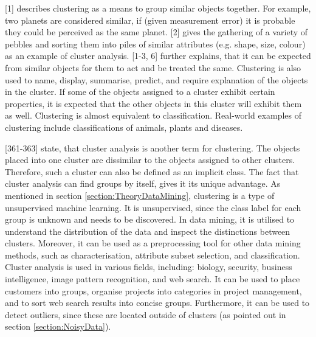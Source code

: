 


\textcite{hartigan1975clustering}[1] describes clustering as a means to group similar objects together. For example, two planets are considered similar, if (given measurement error) it is probable they could be perceived as the same planet. \textcite{romesburg2004cluster}[2] gives the gathering of a variety of pebbles and sorting them into piles of similar attributes (e.g. shape, size, colour) as an example of cluster analysis. \textcite{hartigan1975clustering}[1-3, 6] further explains, that it can be expected from similar objects for them to act and be treated the same. Clustering is also used to name, display, summarise, predict, and require explanation of the objects in the cluster. If some of the objects assigned to a cluster exhibit certain properties, it is expected that the other objects in this cluster will exhibit them as well. Clustering is almost equivalent to classification. Real-world examples of clustering include classifications of animals, plants and diseases.

\textcite{han2011data}[361-363] state, that cluster analysis is another term for clustering. The objects placed into one cluster are dissimilar to the objects assigned to other clusters. Therefore, such a cluster can also be defined as an implicit class. The fact that cluster analysis can find groups by itself, gives it its unique advantage. As mentioned in section \ref{section:TheoryDataMining}, clustering is a type of unsupervised machine learning. It is unsupervised, since the class label for each group is unknown and needs to be discovered. In data mining, it is utilised to understand the distribution of the data and inspect the distinctions between clusters. Moreover, it can be used as a preprocessing tool for other data mining methods, such as characterisation, attribute subset selection, and classification.
Cluster analysis is used in various fields, including: biology, security, business intelligence, image pattern recognition, and web search. It can be used to place customers into groups, organise projects into categories in project management, and to sort web search results into concise groups. Furthermore, it can be used to detect outliers, since these are located outside of clusters (as pointed out in section \ref{section:NoisyData}).


